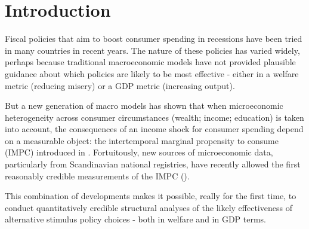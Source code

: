 \documentclass[\econtexRoot/HAFiscal]{subfiles}
\begin{document}
\hypertarget{Introduction}{}
\section{Introduction}\notinsubfile{\label{sec:intro}}
\setcounter{page}{0}

Fiscal policies that aim to boost consumer spending in recessions have been tried in many countries in recent years.  The nature of these policies has varied widely, perhaps because traditional macroeconomic models have not provided plausible guidance about which policies are likely to be most effective - either in a welfare metric (reducing misery) or a GDP metric (increasing output).

But a new generation of macro models has shown that when microeconomic heterogeneity across consumer circumstances (wealth; income; education) is taken into account, the consequences of an income shock for consumer spending depend on a measurable object: the intertemporal marginal propensity to consume (IMPC) introduced in \cite{auclert2018IKC}.  Fortuitously, new sources of microeconomic data, particularly from Scandinavian national registries, have recently allowed the first reasonably credible measurements of the IMPC (\cite{fagereng_mpc_2021}).

This combination of developments makes it possible, really for the first time, to conduct quantitatively credible structural analyses of the likely effectiveness of alternative stimulus policy choices - both in welfare and in GDP terms.
\end{document}
